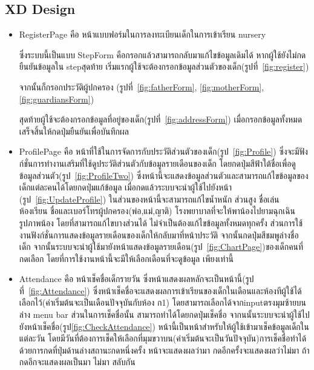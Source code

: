 \subsection{XD Design}

\begin{itemize}
  \item RegisterPage คือ หน้าแบบฟอร์มในการลงทะเบียนเด็กในการเข้าเรียน nursery 
  
  ซึ่งระบบนี้เป็นแบบ StepForm คือกรอกแล้วสามารถกลับมาแก้ไขข้อมูลเดิมได้ หากผู้ใช้ยังไม่กดยืนยันข้อมูลใน stepสุดท้าย
  เริ่มแรกผู้ใช้จะต้องกรอกข้อมูลส่วนตัวของเด็ก(รูปที่~\ref{fig:register}) 
  
  จากนั้นก็กรอกประวัติผู้ปกครอง (รูปที่~\ref{fig:fatherForm}, \ref{fig:motherForm}, \ref{fig:guardiansForm})
  
  สุดท้ายผู้ใช้จะต้องกรอกข้อมูลที่อยู่ของเด็ก(รูปที่~\ref{fig:addressForm}) เมื่อกรอกข้อมูลทั้งหมดเสร็จสิ้นให้กดปุ่มยืนยันเพื่อบันทึกผล
  
  \item  ProfilePage คือ หน้าที่ใช้ในการจัดการกับประวัติส่วนตัวของเด็ก(รูป~\ref{fig:Profile}) ซึ่งจะมีฟังก์ชั่นการทำงานเสริมที่ใช้ดูประวัติส่วนตัวกับข้อมูลรายเดือนของเด็ก
  โดยกดปุ่มสีฟ้าใต้ชื่อเพื่อดูข้อมูลส่วนตัว(รูป~\ref{fig:ProfileTwo}) ซึ่งหน้านี้จะแสดงข้อมูลส่วนตัวและสามารถแก้ไขข้อมูลของเด็กแต่ละคนได้โดยกดปุ่มแก้ข้อมูล เมื่อกดแล้วระบบจะนำผู้ใช้ไปยังหน้า (รูป~\ref{fig:UpdateProfile}) 
  ในส่วนของหน้านี้จะสามารถแก้ไขน้ำหนัก ส่วนสูง ชื่อเล่น ห้องเรียน ชื่อและเบอร์โทรผู้ปกครอง(พ่อ,แม่,ญาติ) โรงพยาบาลที่จะให้พาน้องไปยามฉุกเฉิน รูปภาพน้อง 
  โดยที่สามารถแก้ไขบางส่วนได้ ไม่จำเป็นต้องแก้ไขข้อมูลทั้งหมดทุกครั้ง 
  ส่วนการใช้งานฟังก์ชั่นการแสดงข้อมูลรายเดือนของเด็กให้กลับมาที่หน้าประวัติ จากนั้นกดปุ่มสีชมพูล่างชื่อเด็ก
  จากนั้นระบบจะนำผู้ใช้มายังหน้าแสดงข้อมูลรายเดือน(รูป~\ref{fig:ChartPage})ของเด็กคนที่กดเลือก โดยที่การใช้งานหน้านี้จะมีให้เลือกเดือนที่จะดูข้อมูล เพียงเท่านี้
  
  \item  Attendance คือ หน้าเช็คชื่อเด็กรายวัน ซึ่งหน้าแสดงผลหลักจะเป็นหน้านี้(รูปที่~\ref{fig:Attendance}) ซึ่งหน้าเช็คชื่อจะแสดงผลการเข้าเรียนของเด็กในเดือนและห้องทีผู้ใช้ได้เลือกไว้(ค่าเริ่มต้นจะเป็นเดือนปัจจุบันกับห้อง ก1) 
  โดยสามารถเลือกได้จากinputตรงมุมซ้ายบนล่าง menu bar ส่วนในการเช็คชื่อนั้น สามารถทำได้โดยกดปุ่มเช็คชื่อ
  จากนนั้นระบบจะนำผู้ใช้ไปยังหน้าเช็คชื่อ(รูป\ref{fig:CheckAttendance}) หน้านี้เป็นหน้าสำหรับให้ผู้ใช้เข้ามาเช็คข้อมูลเด็กในแต่ละวัน โดยมีวันที่ต้องการเช็คให้เลือกที่มุมขวาบน(ค่าเริ่มต้นจะเป็นวันปัจจุบัน)การเช็คชื่อทำได้ด้วยการกดที่ปุ่มด้านล่างสถานะกดหนึ่งครั้ง
  หน้าจะแสดงผลว่ามา กดอีกครั้งจะแสดงผลว่าไม่มา ถ้ากดอีกจะแสดงผลเป็นมา ไม่มา สลับกัน


\end{itemize}
